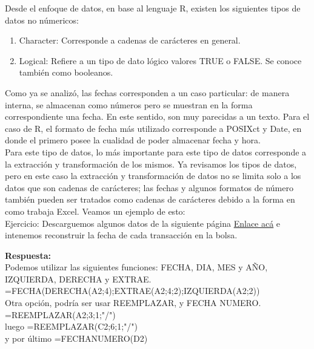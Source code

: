 \documentclass[12 pt,letterpaper]{article}
\newenvironment{solution}
{\begin{mdframed} \textbf{Respuesta:} \ \\}
	{\end{mdframed}}
\begin{document}
Desde el enfoque de datos, en base al lenguaje R, existen los siguientes tipos de datos no númericos:

\begin{enumerate}
	\item Character: Corresponde a cadenas de carácteres en general. 
	\item Logical: Refiere a un tipo de dato lógico valores TRUE o FALSE. Se conoce también como booleanos. 
\end{enumerate}

Como ya se analizó, las fechas corresponden a un caso particular: de manera interna, se almacenan como números pero se muestran en la forma correspondiente una fecha. En este sentido, son muy parecidas a un texto. Para el caso de R, el formato de fecha más utilizado corresponde a POSIXct y Date, en donde el primero posee la cualidad de poder almacenar fecha y hora. \\

Para este tipo de datos, lo más importante para este tipo de datos corresponde a la extracción y transformación de los mismos. Ya revisamos los tipos de datos, pero en este caso la extracción y transformación de datos no se limita solo a los datos que son cadenas de carácteres; las fechas y algunos formatos de número también pueden ser tratados como cadenas de carácteres debido a la forma en como trabaja Excel. Veamos un ejemplo de esto:\\

\noindent
{\Huge \faBell} Ejercicio: Descarguemos algunos datos de la siguiente página  \href{https://es.investing.com/indices/investing.com-btc-usd-historical-data}{Enlace acá} e intenemos reconstruir la fecha de cada transacción en la bolsa.

\begin{solution}
	Podemos utilizar las siguientes funciones: FECHA, DIA, MES y AÑO, IZQUIERDA, DERECHA y EXTRAE. \\
	
	=FECHA(DERECHA(A2;4);EXTRAE(A2;4;2);IZQUIERDA(A2;2)) \\
	
	Otra opción, podría ser usar REEMPLAZAR, y FECHA NUMERO. \\
	
	=REEMPLAZAR(A2;3;1;"/") \\
	
	luego =REEMPLAZAR(C2;6;1;"/") \\
	
	y por último =FECHANUMERO(D2)	
\end{solution}
\end{document}

